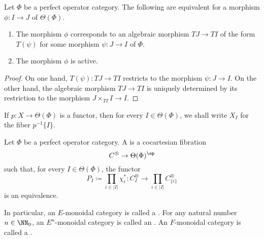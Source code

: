 \begin{lemma}%
	\label{lem:characterizationofactive}
	Let $ \Phi $ be a perfect operator category.
	The following are equivalent
	for a morphism $ \phi \colon I \to J $ of $ \Theta(\Phi) $.
	\begin{enumerate}
		\item The morphism $ \phi $ corresponds to an algebraic morphism
			$ TJ \to TI $ of the form $ T(\psi) $ for
			some morphism $ \psi \colon J \to I $ of $ \Phi $.
		\item The morphism $ \phi $ is active. 
	\end{enumerate}
\end{lemma}

\begin{proof}
	On one hand, $ T(\psi) \colon TJ \to TI $ restricts to
	the morphism $ \psi \colon J \to I $.
	On the other hand, the algebraic morphism
	$ TJ \to TI $ is uniquely determined by its restriction to
	the morphism $ J \times_{TI} I \to I $.
\end{proof}

\begin{notation}
	If $ p \colon X \to \Theta(\Phi) $ is a functor, then
	for every $ I \in \Theta(\Phi) $, we shall write
	$ X_I $ for the fiber $ p^{-1}\{I\} $.
\end{notation}

\begin{definition}%
	\label{dfn:Phimonoidal}
	Let $ \Phi $ be a perfect operator category.
	A  is a cocartesian fibration
	\[ C^{\otimes} \to \Theta(\Phi)^{\op} \]
	such that, for every $ I \in \Theta(\Phi) $,
	the functor
	\[
		P_I \coloneq \prod_{i \in |I|} \chi_i^{\ast} \colon
		C^{\otimes}_I \to
		\prod_{i \in |I|} C^{\otimes}_{\{i\}}
	\]
	is an equivalence.

	In particular, an $ E $-monoidal category is called
	a .
	For any natural number $ n \in \NN_0 $,
	an $ E^n $-monoidal category is called
	an .
	An $ F $-monoidal category is called
	a .
\end{definition}

